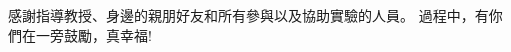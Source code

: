 \begin{acknowledgements} 

感謝指導教授、身邊的親朋好友和所有參與以及協助實驗的人員。
過程中，有你們在一旁鼓勵，真幸福!


\end{acknowledgements} 